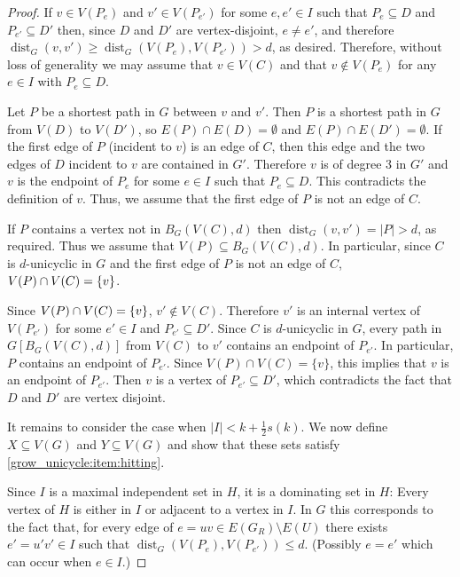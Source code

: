 \documentclass{patmorin}
\DeclareMathOperator{\dist}{dist}
\DeclarePairedDelimiter\set{\{}{\}}
\begin{document}
\begin{proof}
  
    If $v\in V(P_e)$ and $v'\in V(P_{e'})$ for some  $e,e' \in I$ such that $P_e\subseteq D$ and $P_{e'}\subseteq D'$ then, 
    since $D$ and $D'$ are vertex-disjoint, $e\neq e'$, and therefore 
    $\dist_G(v,v')\geq  \dist_G(V(P_e),V(P_{e'}))>d$, as desired.  Therefore, without loss of generality we may assume that $v\in V(C)$ and that $v\notin V(P_e)$ for any $e\in I$ with $P_e\subseteq D$.
    
    Let $P$ be a shortest path in $G$ between $v$ and $v'$.  Then $P$ is a shortest path in $G$ from $V(D)$ to $V(D')$, so $E(P)\cap E(D)=\emptyset$ and $E(P)\cap E(D')=\emptyset$.  If the first edge of $P$ (incident to $v$) is an edge of $C$, then this edge and the two edges of $D$ incident to $v$ are contained in $G'$. Therefore $v$ is of degree $3$ in $G'$ and $v$ is the endpoint of $P_e$ for some $e\in I$ such that $P_e\subseteq D$.  This contradicts the definition of $v$.
    Thus, we assume that the first edge of $P$ is not an edge of $C$. 
    
    If $P$ contains a vertex not in $B_G(V(C),d)$ then $\dist_G(v,v')=|P|>d$, as required.  Thus we assume that $V(P)\subseteq B_G(V(C),d)$.
    In particular, since $C$ is $d$-unicyclic in $G$ and the first edge of $P$ is not an edge of $C$, $V(P)\cap V(C)=\set{v}$. 
    
    Since $V(P)\cap V(C)=\set{v}$,  $v'\notin V(C)$.  Therefore $v'$ is an internal vertex of $V(P_{e'})$ for some $e'\in I$ and $P_{e'}\subseteq D'$.  Since $C$ is $d$-unicyclic in $G$, every path in $G[B_G(V(C),d)]$ from $V(C)$ to $v'$ contains an endpoint of $P_{e'}$.  In particular, $P$ contains an endpoint of $P_{e'}$.  Since $V(P)\cap V(C)=\{v\}$, this implies that $v$ is an endpoint of $P_{e'}$.  Then $v$ is a vertex of $P_{e'}\subseteq D'$, which contradicts the fact that $D$ and $D'$ are vertex disjoint.   
    
  It remains to consider the case when $|I| < k+\frac{1}{2}s(k)$.  We now define $X\subseteq V(G)$ and $Y\subseteq V(G)$ and show that these sets satisfy \cref{grow_unicycle:item:hitting}.  
  
  Since $I$ is a maximal independent set in $H$, it is a dominating set in $H$: Every vertex of $H$ is either in $I$ or adjacent to a vertex in $I$.  In $G$ this corresponds to the fact that, for every edge of $e=uv\in E(G_R)\setminus E(U)$ there exists $e'=u'v'\in I$ such that $\dist_G(V(P_{e}),V(P_{e'}))\le d$.  (Possibly $e=e'$ which can occur when $e\in I$.)


\end{proof}
\end{document}
